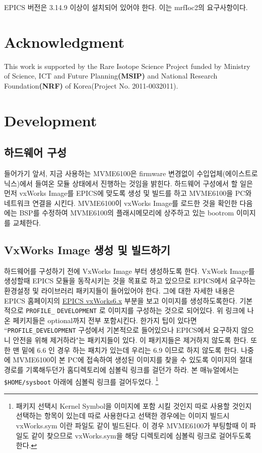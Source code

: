 \documentclass[11pt,a4paper]{article}
\newcommand\SEC[1]{\textbf{\uppercase{#1}}}
\begin{document}
EPICS 버전은 3.14.9 이상이 설치되어 있어야 한다. 이는 mrfIoc2의 요구사항이다.

\section{Acknowledgment}
This work is supported by the Rare Isotope Science Project funded by Ministry of Science, ICT and Future Planning\SEC{(MSIP)} and National Research Foundation\SEC{(NRF)} of Korea(Project No. 2011-0032011).


\section{Development}
\subsection{하드웨어 구성}
들어가기 앞서, 지금 사용하는 MVME6100은 firmware 변경없이 수입업체(에이스트로닉스)에서 들여온 모듈 상태에서 진행하는 것임을 밝힌다.
하드웨어 구성에서 할 일은 먼저 vxWorks Image를 EPICS에 맞도록 생성 및 빌드를 하고 MVME6100을 PC와 네트워크 연결을 시킨다. 
MVME6100이 vxWorks Image를 로드한 것을 확인한 다음에는 BSP를 수정하여 MVME6100의 플래시메모리에 상주하고 있는 bootrom 이미지를 
교체한다.

\subsection{VxWorks Image 생성 및 빌드하기}
하드웨어를 구성하기 전에 VxWorks Image 부터 생성하도록 한다. VxWork Image를 생성할때 EPICS 모듈을 동작시키는 것을 
목표로 하고 있으므로 EPICS에서 요구하는 환경설정 및 라이브러리 패키지들이 들어있어야 한다. 그에 대한 자세한 내용은
EPICS 홈페이지의 \href{http://www.aps.anl.gov/epics/base/vxWorks6.php}{EPICS vxWorks6.x} 부분을 보고 이미지를 생성하도록한다.
기본적으로 \verb|PROFILE_| \verb|DEVELOPMENT| 로 이미지를 구성하는 것으로 되어있다. 위 링크에 나온 페키지들은 optional까지 전부 포함시킨다. 
한가지 팁이 있다면 ``\verb|PROFILE_DEVELOPMENT| 구성에서 기본적으로 들어있으나 EPICS에서 요구하지 않으니 안전을 위해 제거하라"는 패키지들이 있다. 이 패키지들은 제거하지 않도록 한다. 또한 맨 밑에 6.6 인 경우 하는 패치가 있는데 우리는 6.9 이므로 하지 않도록 한다.
나중에 MVME6100이 본 PC에 접속하여 생성된 이미지를 찾을 수 있도록 이미지의 절대 경로를 기록해두던가 홈디렉토리에 심볼릭 링크를 걸던가 하라. 본 매뉴얼에서는 \verb|$HOME/sysboot| 아래에 심볼릭 링크를 걸어두었다. \footnote{패키지 선택시 Kernel Symbol을 이미지에 포함 시킬 것인지 따로 사용할 것인지 선택하는 항목이 있는데 따로 사용한다고 선택한 경우에는 이미지 빌드시 vxWorks.sym 이란 파일도 같이 빌드된다. 이 경우 MVME6100가 부팅할때 이 파일도 같이 찾으므로 vxWorks.sym을 해당 디렉토리에 심볼릭 링크로 걸어두도록 한다.}
\end{document}
